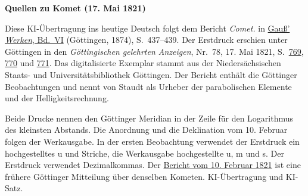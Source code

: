 \clearpage\thispagestyle{empty}
\begin{center}\textbf{Quellen zu Komet (17. Mai 1821)}\end{center}
\noindent Diese KI-Übertragung ins heutige Deutsch folgt dem Bericht \textit{Comet.} in \href{https://gdz.sub.uni-goettingen.de/id/PPN236007467}{Gauß’ \textit{Werken}, Bd.~VI} (Göttingen, 1874), S.~437--439. Der Erstdruck erschien unter Göttingen in den \textit{Göttingischen gelehrten Anzeigen}, Nr.~78, 17. Mai 1821, S.~\href{https://images.p.sub.uni-goettingen.de/iiif/image/gdz:PPN319721507_1821:00000773/full/1600,/0/default.jpg}{769}, \href{https://images.p.sub.uni-goettingen.de/iiif/image/gdz:PPN319721507_1821:00000774/full/1600,/0/default.jpg}{770} und \href{https://images.p.sub.uni-goettingen.de/iiif/image/gdz:PPN319721507_1821:00000775/full/1600,/0/default.jpg}{771}. Das digitalisierte Exemplar stammt aus der Niedersächsischen Staats- und Universitätsbibliothek Göttingen. Der Bericht enthält die Göttinger Beobachtungen und nennt von Staudt als Urheber der parabolischen Elemente und der Helligkeitsrechnung.
\par\smallskip\noindent Beide Drucke nennen den Göttinger Meridian in der Zeile für den Logarithmus des kleinsten Abstands. Die Anordnung und die Deklination vom 10. Februar folgen der Werkausgabe. In der ersten Beobachtung verwendet der Erstdruck ein hochgestelltes u und Striche, die Werkausgabe hochgestellte u, m und s. Der Erstdruck verwendet Dezimalkommas. Der \hyperlink{native-440-part-lower}{Bericht vom 10. Februar 1821} ist eine frühere Göttinger Mitteilung über denselben Kometen. KI-Übertragung und KI-Satz.
\clearpage
